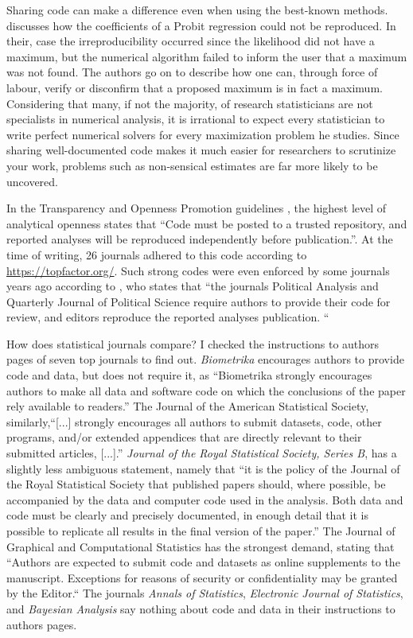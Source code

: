Sharing code can make a difference even when using the best-known methods. \textcite{McCullough2003-zd} discusses how the coefficients of a Probit regression could not be reproduced. In their, case the irreproducibility occurred since the likelihood did not have a maximum, but the numerical algorithm failed to inform the user that a maximum was not found. The authors go on to describe how one can, through force of labour, verify or disconfirm that a proposed maximum is in fact a maximum. Considering that many, if not the majority, of research statisticians are not specialists in numerical analysis, it is irrational to expect every statistician to write perfect numerical solvers for every maximization problem he studies. Since sharing well-documented code makes it much easier for researchers to scrutinize your work, problems such as non-sensical estimates are far more likely to be uncovered.

In the Transparency and Openness Promotion guidelines \parencite{Nosek2015-hh}, the highest level of analytical openness states that ``Code must be posted to a trusted repository, and reported analyses will be reproduced independently before publication.''. At the time of writing, 26 journals adhered to this code according to \url{https://topfactor.org/}. Such strong codes were even enforced by some journals years ago according to \textcite{Nosek2015-hh}, who states that ``the journals Political Analysis and Quarterly Journal of Political Science require authors to provide their code for review, and editors reproduce the reported analyses publication. ``

How does statistical journals compare? I checked the instructions to authors pages of seven top journals to find out. \emph{Biometrika} encourages authors to provide code and data, but does not require it, as ``Biometrika strongly encourages authors to make all data and software code on which the conclusions of the paper rely available to readers.'' The Journal of the American Statistical Society, similarly,``[...] strongly encourages all authors to submit datasets, code, other programs, and/or extended appendices that are directly relevant to their submitted articles, [...].'' \emph{Journal of the Royal Statistical Society, Series B}, has a slightly less ambiguous statement, namely that ``it is the policy of the Journal of the Royal Statistical Society that published papers should, where possible, be accompanied by the data and computer code used in the analysis. Both data and code must be clearly and precisely documented, in enough detail that it is possible to replicate all results in the final version of the paper.'' The Journal of Graphical and Computational Statistics has the strongest demand, stating that ``Authors are expected to submit code and datasets as online supplements to the manuscript. Exceptions for reasons of security or confidentiality may be granted by the Editor.`` The journals \emph{Annals of Statistics}, \emph{Electronic Journal of Statistics}, and \emph{Bayesian Analysis} say nothing about code and data in their instructions to authors pages.

